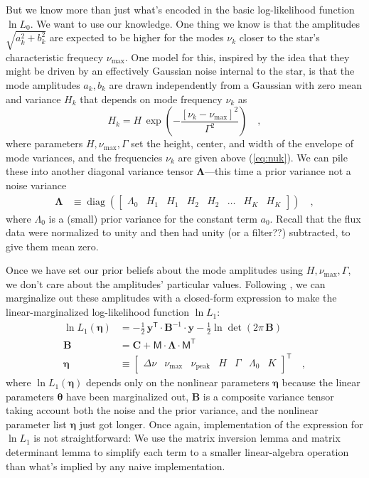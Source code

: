 \documentclass[modern]{aastex63}
\newcommand{\nupeak}{\nu_\mathrm{peak}}
\newcommand{\numax}{\nu_\mathrm{max}}
\newcommand{\T}{^{\!\mathsf{T}\!}}
\newcommand{\inv}{^{-1}}
\renewcommand{\vector}[1]{\boldsymbol{#1}}
\newcommand{\vy}{\vector{y}}
\newcommand{\veta}{\vector{\eta}}
\newcommand{\vtheta}{\vector{\theta}}
\renewcommand{\tensor}[1]{\mathbf{#1}}
\newcommand{\tB}{\tensor{B}}
\newcommand{\tC}{\tensor{C}}
\DeclareMathOperator{\diag}{diag}
\newcommand{\tLambda}{\tensor{\Lambda}}
\newcommand{\mat}[1]{\mathsf{#1}}
\newcommand{\mM}{\mat{M}}
\begin{document}
But we know more than just what's encoded in the basic log-likelihood function $\ln L_0$.
We want to use our knowledge.
One thing we know is that the amplitudes $\sqrt{a_k^2+b_k^2}$
are expected to be higher for the
modes $\nu_k$ closer to the star's characteristic frequecy $\numax$.
One model for this, inspired by the idea that they might be driven
by an effectively Gaussian noise internal to the star, is that the mode
amplitudes $a_k, b_k$ are drawn independently from a Gaussian with zero
mean and variance $H_k$ that depends on mode frequency $\nu_k$ as
\begin{equation}\label{eq:bell}
  H_k = H\,\exp(- \frac{[\nu_k - \numax]^2}{\Gamma^2})
  \quad ,
\end{equation}
where parameters $H, \numax, \Gamma$ set the height, center, and width of
the envelope of mode variances, and the frequencies $\nu_k$ are given
above (\ref{eq:nuk}).
We can pile these into another diagonal variance tensor $\tLambda$---this time
a prior variance not a noise variance
\begin{align}
  \tLambda &\equiv \diag(\begin{bmatrix} \Lambda_0 & H_1 & H_1 & H_2 & H_2 & \hdots & H_K & H_K \end{bmatrix})
  \quad ,
\end{align}
where $\Lambda_0$ is a (small) prior variance for the constant term $a_0$.
Recall that the flux data were normalized to unity and then had unity
(or a filter??) subtracted, to give them mean zero.

Once we have set our prior beliefs about the mode amplitudes using $H,
\numax, \Gamma$, we don't care about the amplitudes' particular values.
Following \citet{gaussianproduct}, we can marginalize out these amplitudes
with a closed-form expression to make the
linear-marginalized log-likelihood function $\ln L_1$:
\begin{align}
  \ln L_1(\veta) &= -\frac{1}{2}\,\vy\T\cdot\tB\inv\cdot\vy - \frac{1}{2}\ln\det(2\pi\,\tB)
  \\
  \tB &= \tC + \mM\cdot\tLambda\cdot\mM\T
  \\
  \veta &\equiv \begin{bmatrix} \Delta\nu & \numax & \nupeak & H & \Gamma & \Lambda_0 & K \end{bmatrix}\T
  \quad ,
\end{align}
where $\ln L_1(\veta)$ depends only on the nonlinear parameters $\veta$ because
the linear parameters $\vtheta$ have been marginalized out,
$\tB$ is a composite variance tensor taking account both the noise
and the prior variance, and the nonlinear parameter list $\veta$ just got
longer.
Once again, implementation of the expression for $\ln L_1$ is not straightforward:
We use the matrix inversion lemma and matrix determinant lemma to simplify each
term to a smaller linear-algebra operation than what's implied by any naive
implementation.
\end{document}
